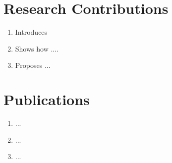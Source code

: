 
\section{Research Contributions}


\begin{enumerate}

    \item Introduces
    \item Shows how ....
    \item Proposes ...

\end{enumerate}



\section{Publications}

\begin{enumerate}
    \item ...

    \item ...

    \item ...

\end{enumerate}
\cleardoublepage
